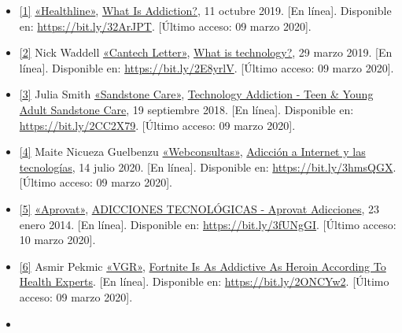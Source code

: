 \documentclass[12pt,spanish,Letterpaper,openany]{book}
\begin{document}
\begin{itemize}
\item
  \hypertarget{articulo09_ref01}{}

  \protect\hyperlink{articulo09_cross01}{{[}1{]}} \href{https://www.healthline.com/}{«Healthline»}, \href{https://www.healthline.com/health/addiction}{What Is Addiction?}, 11 octubre 2019. {[}En línea{]}. Disponible en: \url{https://bit.ly/32ArJPT}. {[}Último acceso: 09 marzo 2020{]}.
\item
  \hypertarget{articulo09_ref02}{}

  \protect\hyperlink{articulo09_cross02}{{[}2{]}} Nick Waddell \href{https://www.cantechletter.com/}{«Cantech Letter»}, \href{https://www.cantechletter.com/2013/01/what-is-technology0103/}{What is technology?}, 29 marzo 2019. {[}En línea{]}. Disponible en: \url{https://bit.ly/2E8yrlV}. {[}Último acceso: 09 marzo 2020{]}.
\item
  \hypertarget{articulo09_ref03}{}

  \protect\hyperlink{articulo09_cross03}{{[}3{]}} Julia Smith \href{https://www.sandstonecare.com/}{«Sandstone Care»}, \href{https://www.sandstonecare.com/resources/substance-abuse/technology-addiction}{Technology Addiction - Teen \& Young Adult \textbar{} Sandstone Care}, 19 septiembre 2018. {[}En línea{]}. Disponible en: \url{https://bit.ly/2CC2X79}. {[}Último acceso: 09 marzo 2020{]}.
\item
  \hypertarget{articulo09_ref04}{}

  \protect\hyperlink{articulo09_cross04}{{[}4{]}} Maite Nicueza Guelbenzu \href{https://www.webconsultas.com/}{«Webconsultas»}, \href{https://www.webconsultas.com/mente-y-emociones/adicciones/por-que-somos-adictos-a-internet}{Adicción a Internet y las tecnologías}, 14 julio 2020. {[}En línea{]}. Disponible en: \url{https://bit.ly/3hmsQGX}. {[}Último acceso: 09 marzo 2020{]}.
\item
  \hypertarget{articulo09_ref05}{}

  \protect\hyperlink{articulo09_cross05}{{[}5{]}} \href{http://www.aprovat.org/}{«Aprovat»}, \href{http://www.aprovat.org/adicciones-tecnologicas/}{ADICCIONES TECNOLÓGICAS - Aprovat Adicciones}, 23 enero 2014. {[}En línea{]}. Disponible en: \url{https://bit.ly/3fUNgGI}. {[}Último acceso: 10 marzo 2020{]}.
\item
  \hypertarget{articulo09_ref06}{}

  \protect\hyperlink{articulo09_cross06}{{[}6{]}} Asmir Pekmic \href{https://www.vgr.com/}{«VGR»}, \href{https://www.vgr.com/fortnite-is-as-addictive-as-heroin-according-to-health-experts/}{Fortnite Is As Addictive As Heroin According To Health Experts}. {[}En línea{]}. Disponible en: \url{https://bit.ly/2ONCYw2}. {[}Último acceso: 09 marzo 2020{]}.
\item
  \hypertarget{articulo09_ref07}{}


\end{itemize}
\end{document}
